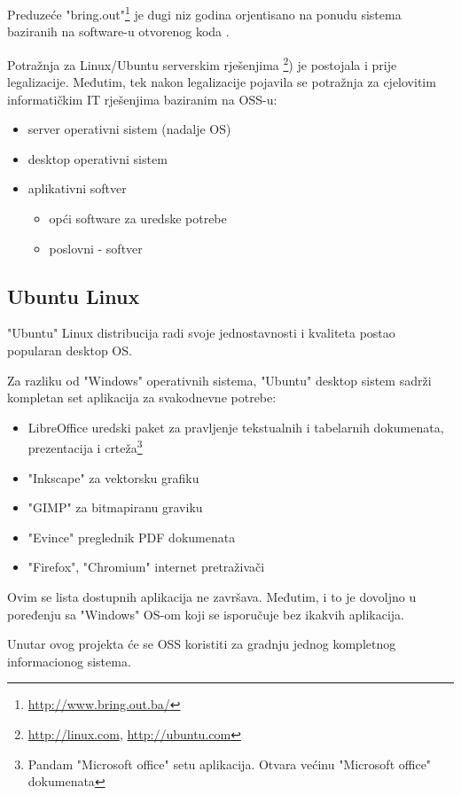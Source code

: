 \documentclass[times, utf8, seminar]{fit}
\begin{document}
Preduzeće "bring.out"\footnote{\url{http://www.bring.out.ba/}} je dugi niz godina orjentisano na ponudu sistema baziranih na software-u otvorenog koda .

Potražnja za Linux/Ubuntu serverskim rješenjima \footnote{\url{http://linux.com}, \url{http://ubuntu.com}}) je postojala i prije legalizacije. Međutim, tek nakon legalizacije pojavila se potražnja za cjelovitim informatičkim IT rješenjima baziranim na OSS-u:
\begin{itemize}
  \item server operativni sistem (nadalje OS)
  \item desktop operativni sistem
  \item aplikativni softver
  \begin{itemize}
    \item opći software za uredske potrebe
    \item poslovni - softver 
  \end{itemize}
\end{itemize}

\subsection{Ubuntu Linux}
"Ubuntu" Linux distribucija radi svoje jednostavnosti i kvaliteta postao popularan desktop OS.

Za razliku od "Windows" operativnih sistema, "Ubuntu" desktop sistem sadrži kompletan set aplikacija za svakodnevne potrebe:
\begin{itemize}
  \item LibreOffice uredski paket za pravljenje tekstualnih i tabelarnih dokumenata, prezentacija i crteža\footnote{Pandam "Microsoft office" setu aplikacija. Otvara većinu "Microsoft office" dokumenata }
  \item "Inkscape" za vektorsku grafiku
  \item "GIMP" za bitmapiranu graviku
  \item "Evince" preglednik PDF dokumenata
  \item "Firefox", "Chromium" internet pretraživači
\end{itemize}  
 
Ovim se lista dostupnih aplikacija ne završava. Međutim, i to je dovoljno u poređenju sa "Windows" OS-om koji se isporučuje bez ikakvih aplikacija.

Unutar ovog projekta će se OSS koristiti za gradnju jednog kompletnog informacionog sistema.
\end{document}
